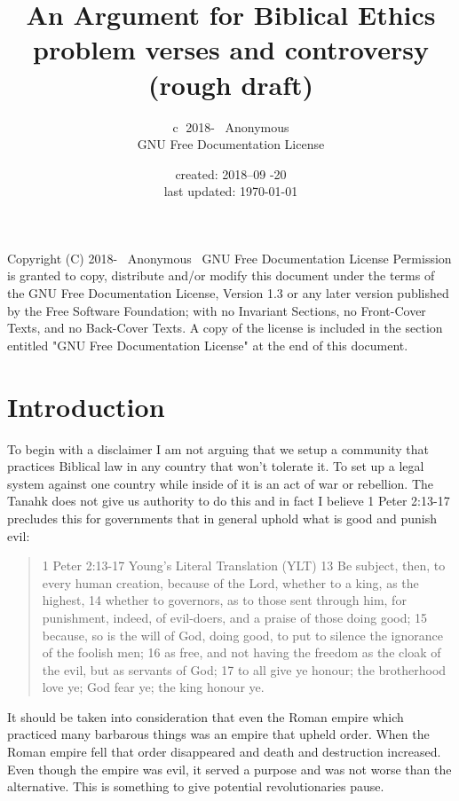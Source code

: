 \documentclass[11pt]{article}
\title{\textbf{An Argument for Biblical Ethics} \large \\ problem verses and controversy (rough draft) }
\author{\textcircled{c} 2018-\the\year
 \ Anonymous \\ GNU Free Documentation License  }
\date{created: 2018--09 -20 \\ last updated: \today{}}
\begin{document}
\maketitle
\tableofcontents 

\noindent \newline Copyright (C) 2018-\the\year
 \ Anonymous \ GNU Free Documentation License \newline
Permission is granted to copy, distribute and/or modify this document\newline
under the terms of the GNU Free Documentation License, Version 1.3\newline
or any later version published by the Free Software Foundation;\newline
with no Invariant Sections, no Front-Cover Texts, and no Back-Cover Texts.\newline
A copy of the license is included in the section entitled "GNU\newline
Free Documentation License" at the end of this document.

\section{Introduction}
To begin with a disclaimer I am not arguing that we setup a community that practices Biblical law in any country that won't tolerate it. To set up a legal system against one country while inside of it is an act of war or rebellion. The Tanahk does not give us authority to do this and in fact I believe 1 Peter 2:13-17 precludes this for governments that in general uphold what is good and punish evil: 

\begin{quote}
1 Peter 2:13-17 Young's Literal Translation (YLT)
13 Be subject, then, to every human creation, because of the Lord, whether to a king, as the highest,
14 whether to governors, as to those sent through him, for punishment, indeed, of evil-doers, and a praise of those doing good;
15 because, so is the will of God, doing good, to put to silence the ignorance of the foolish men;
16 as free, and not having the freedom as the cloak of the evil, but as servants of God;
17 to all give ye honour; the brotherhood love ye; God fear ye; the king honour ye.
\end{quote}

It should be taken into consideration that even the Roman empire which practiced many barbarous things was an empire that upheld order. When the Roman empire fell that order disappeared and death and destruction increased. Even though the empire was evil, it served a purpose and was not worse than the alternative. This is something to give potential revolutionaries pause.
\end{document}
